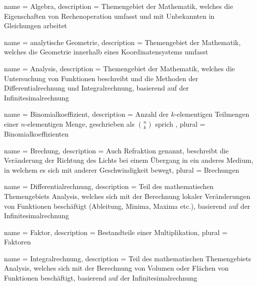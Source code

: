 
\usepackage[toc]{glossaries}
\makeglossaries





{
    name = Algebra,
    description = {Themengebiet der Mathematik, welches die Eigenschaften von Rechenoperation umfasst und mit Unbekannten in Gleichungen arbeitet}
}

{
    name = analytische Geometrie,
    description = {Themengebiet der Mathematik, welches die Geometrie innerhalb eines Koordinatensystems umfasst}
}

{
    name = Analysis,
    description = {Themengebiet der Mathematik, welches die Untersuchung von Funktionen beschreibt und die Methoden der \Gls{Differentialrechnung} und \Gls{Integralrechnung}, basierend auf der \Gls{Infinitesimalrechnung}}
}

{
    name = Binomialkoeffizient,
    description = {Anzahl der $k$-elementigen Teilmengen einer $n$-elementigen Menge, geschrieben als $\binom{n}{k}$ sprich },
    plural = {Binomialkoeffizienten}
}

{
    name = Brechung,
    description = {Auch Refraktion genannt, beschreibt die Veränderung der Richtung des Lichts bei einem Übergang in ein anderes Medium, in welchem es sich mit anderer Geschwindigkeit bewegt},
    plural = {Brechungen}
}

{
    name = Differentialrechnung,
    description = {Teil des mathematischen Themengebiets Analysis, welches sich mit der Berechnung lokaler Veränderungen von Funktionen beschäftigt (Ableitung, Minima, Maxima etc.), basierend auf der \Gls{Infinitesimalrechnung}}
}

{
    name = Faktor,
    description = {Bestandteile einer Multiplikation},
    plural = Faktoren
}

{
    name = Integralrechnung,
    description = {Teil des mathematischen Themengebiets Analysis, welches sich mit der Berechnung von Volumen oder Flächen von Funktionen beschäftigt, basierend auf der \Gls{Infinitesimalrechnung}}
}

